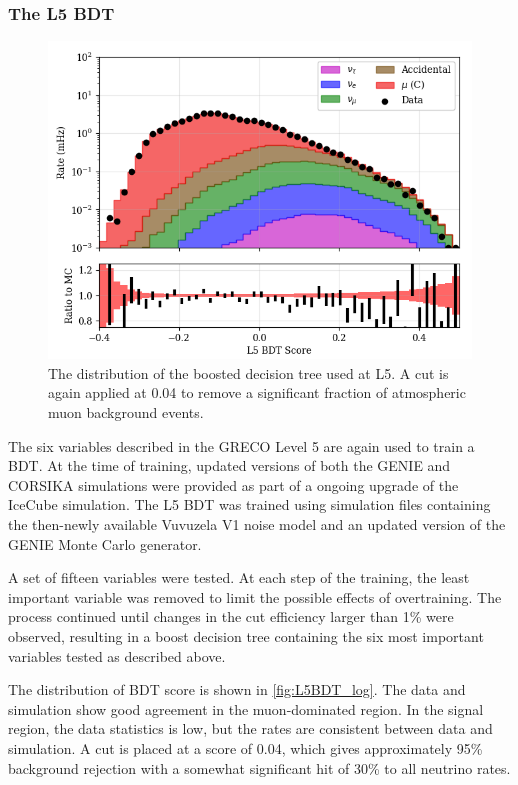 \subsubsection{The L5 BDT}
\begin{figure}[h]
	\centering
		\includegraphics[width=0.9\linewidth]{BDT_Score_log.png}
		\caption[The L5 BDT Score]{The distribution of the boosted decision tree used at L5. A cut is again applied at 0.04 to remove a significant fraction of atmospheric muon background events.}
	\label{fig:L5_bdt_log}
\end{figure}

The six variables described in the GRECO Level 5 are again used to train a BDT. 
At the time of training, updated versions of both the GENIE and CORSIKA simulations were provided as part of a ongoing upgrade of the IceCube simulation.
The L5 BDT was trained using simulation files containing the then-newly available Vuvuzela V1 noise model and an updated version of the GENIE Monte Carlo generator.

A set of fifteen variables were tested.
At each step of the training, the least important variable was removed to limit the possible effects of overtraining.
The process continued until changes in the cut efficiency larger than 1\% were observed, resulting in a boost decision tree containing the six most important variables tested as described above.

The distribution of BDT score is shown in \ref{fig:L5BDT_log}. 
The data and simulation show good agreement in the muon-dominated region.
In the signal region, the data statistics is low, but the rates are consistent between data and simulation.
A cut is placed at a score of 0.04, which gives approximately 95\% background rejection with a somewhat significant hit of 30\% to all neutrino rates.


